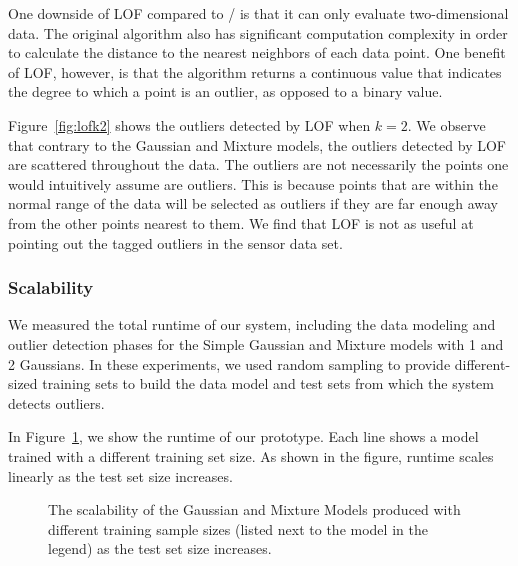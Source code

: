 One downside of LOF compared to \dBoost/ is that it can only evaluate two-dimensional data.
The original algorithm also has significant computation complexity in order to calculate the distance to the nearest neighbors of each data point.
One benefit of LOF, however, is that the algorithm returns a continuous value that indicates the degree to which a point is an outlier, as opposed to a binary value.

Figure~\ref{fig:lofk2} shows the outliers detected by LOF when $k=2$.
We observe that contrary to the Gaussian and Mixture models, the outliers detected by LOF are scattered throughout the data.
The outliers are not necessarily the points one would intuitively assume are outliers.
This is because points that are within the normal range of the data will be selected as outliers if they are far enough away from the other points nearest to them.
We find that LOF is not as useful at pointing out the tagged outliers in the sensor data set.

\subsubsection{Scalability}

We measured the total runtime of our system, including the data modeling and outlier detection phases for the Simple Gaussian and Mixture models with 1 and 2 Gaussians. In these experiments, we used random sampling to provide different-sized training sets to build the data model and test sets from which the system detects outliers.

In Figure~\ref{fig:scaling}, we show the runtime of our prototype. Each line shows a model trained with a different training set size. As shown in the figure, runtime scales linearly as the test set size increases.

\begin{figure}
\centering
{}
\caption{The scalability of the Gaussian and Mixture Models produced with different training sample sizes (listed next to the model in the legend) as the test set size increases.}
\label{fig:scaling}
\end{figure}
